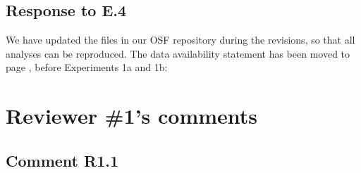 \documentclass[12pt]{article}
\begin{document}
\subsection*{Response to E.4}
We have updated the files in our OSF repository during the revisions, so that all analyses can be reproduced. The data availability statement has been moved to page \pageref{statement}, before Experiments 1a and 1b:

\begin{quote}
\end{quote}

\section*{Reviewer \#1's comments} 
\subsection*{Comment R1.1}
\end{document}
